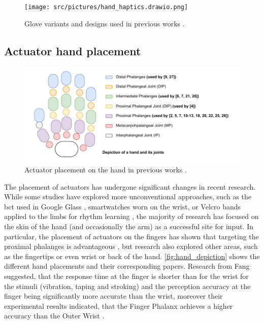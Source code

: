 \begin{figure}[!ht]
    \centering

    \texttt{[image: src/pictures/hand\_haptics.drawio.png]}
    \caption{Glove variants and designs used in previous works \cite{Donchev2021,Fang2023,Fang2023a,Huang2008,Huang2010,Learning2024,Luzhnica2016,Markow2010,Seim2014a,Seim2017,Seim2015b,Seim2014,Vaio6810}.}
    \label{fig:glove_designs}

\end{figure}



\subsection*{Actuator hand placement}
 \begin{figure}[!ht]
    \centering
    \includegraphics[width=\linewidth]{src/pictures/hand_Depiction.drawio.pdf}
    \caption{Actuator placement on the hand in previous works \cite{Learning2024,Fang2023,Fang2023a,Fang2022,Fang2022a,Donchev2021,Hsu2021,Yang2017,Seim2017,Seim2015b,Seim2014a,Seim2014, Huang2010, Vaio6810, Kohlsdorf2010, Markow2010, Huang2008}.}
    \label{fig:hand_depiction}
\end{figure}
The placement of actuators has undergone significant changes in recent research. While some studies have explored more unconventional approaches, such as the \gls{bct} used in Google Glass \cite{Seim2016a}, smartwatches \cite{Seim2018} worn on the wrist, or Velcro bands applied to the limbs for rhythm learning \cite{Bouwer2011, Holland2010}, the majority of research has focused on the skin of the hand (and occasionally the arm) as a successful site for input.
In particular, the placement of actuators on the fingers has shown that targeting the proximal phalanges is advantageous \cite{Fang2022a}, but research also explored other areas, such as the fingertips \cite{Yang2017} or even wrist or back of the hand. \autoref{fig:hand_depiction} shows the different hand placements and their corresponding papers.
Research from Fang suggested, that the response time at the finger is shorter than for the wrist for the stimuli (vibration, taping and stroking) and the perception accuracy at the finger being significantly more accurate than the wrist, moreover their experimental results indicated, that the Finger Phalanx achieves a higher accuracy than the Outer Wrist \cite{Fang2022a}.

